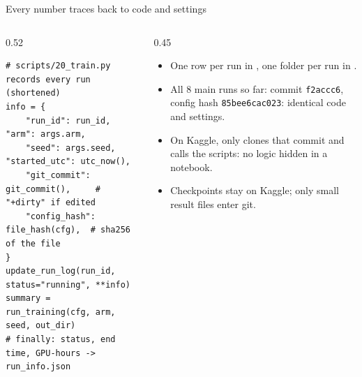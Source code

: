 \begin{frame}[fragile]{Every number traces back to code and settings\hfill\ours\ }
  \begin{columns}[T]
    \begin{column}{0.52\textwidth}
\begin{lstlisting}
# scripts/20_train.py records every run (shortened)
info = {
    "run_id": run_id, "arm": args.arm,
    "seed": args.seed, "started_utc": utc_now(),
    "git_commit": git_commit(),     # "+dirty" if edited
    "config_hash": file_hash(cfg),  # sha256 of the file
}
update_run_log(run_id, status="running", **info)
summary = run_training(cfg, arm, seed, out_dir)
# finally: status, end time, GPU-hours -> run_info.json
\end{lstlisting}
    \end{column}
    \begin{column}{0.45\textwidth}
      \footnotesize
      \begin{itemize}
        \item One row per run in , one folder per run
              in .
        \item All 8 main runs so far: commit \texttt{f2accc6}, config hash
              \texttt{85bee6cac023}: identical code and settings.
        \item On Kaggle,  only clones that
              commit and calls the scripts: no logic hidden in a notebook.
        \item Checkpoints stay on Kaggle; only small result files enter git.
      \end{itemize}
    \end{column}
  \end{columns}
\end{frame}

